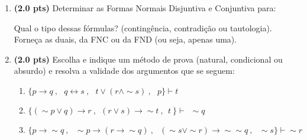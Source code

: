 \documentclass[11pt, a4paper,final]{article}
\begin{document}
\begin{enumerate}

\item {\bf (2.0 pts)} Determinar as Formas Normais Disjuntiva e Conjuntiva para:

Qual o tipo dessas fórmulas? (contingência, contradição ou tautologia). Forneça as duais, da FNC ou  da FND (ou seja, apenas uma).


\item {\bf (2.0 pts)} Escolha e indique um método de prova (natural, condicional ou absurdo) e resolva a validade dos argumentos que se seguem: 

\begin{enumerate}
\item $\{p\rightarrow  q \: , \:\:\: q \leftrightarrow s \: , \:\:\:
 t \vee ( r \wedge \sim s)\: , \:\:\: p \} \vdash  t $ 
 
\item  $\{ ( \sim p \vee q) \rightarrow r \: ,
  \:\: (r \vee s)  \rightarrow \sim t \: ,
    \:\: t \:   \} \vdash \: \:  \sim  q $

\item $\{p\rightarrow \sim q \: , \:\:\: \sim p \rightarrow (r \rightarrow \sim q)  \: , \:\:\: (\sim s \vee \sim r)\rightarrow \sim \sim q  \: , \:\:\: \sim s  \} \vdash  \sim r $ 

    
\end{enumerate}

\begin{comment}
\begin{enumerate}

 
\item  $\{ p \vee q \: ,
  \:\: q \rightarrow r \: ,
    \:\: p \rightarrow s \: ,
     \:\: \sim s   \} \vdash r \wedge (p \vee q) $
\end{enumerate}
\end{comment}  


\end{enumerate}
\end{document}
